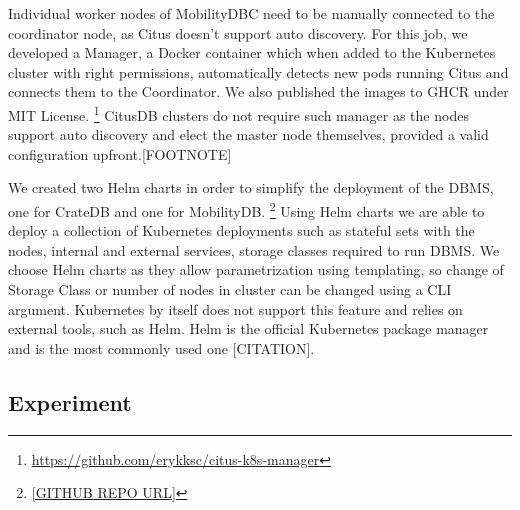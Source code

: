 Individual worker nodes of MobilityDBC need to be manually connected to the coordinator node, as Citus doesn't support auto discovery.
For this job, we developed a Manager, a Docker container which when added to the Kubernetes cluster with right permissions, automatically detects new pods running Citus and connects them to the Coordinator.
We also published the images to GHCR under MIT License.
\footnote{\url{https://github.com/erykksc/citus-k8s-manager}}
CitusDB clusters do not require such manager as the nodes support auto discovery and elect the master node themselves, provided a valid configuration upfront.[FOOTNOTE]

We created two Helm charts in order to simplify the deployment of the DBMS, one for CrateDB and one for MobilityDB.
\footnote{\url{[GITHUB REPO URL]}}
Using Helm charts we are able to deploy a collection of Kubernetes deployments such as stateful sets with the nodes, internal and external services, storage classes required to run DBMS.
We choose Helm charts as they allow parametrization using templating, so change of Storage Class or number of nodes in cluster can be changed using a CLI argument.
Kubernetes by itself does not support this feature and relies on external tools, such as Helm.
Helm is the official Kubernetes package manager and is the most commonly used one [CITATION].

\subsection{Experiment}
\label{sec:experiment}



